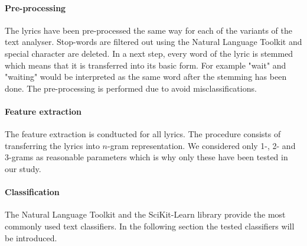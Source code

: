 \documentclass[a4paper,12pt]{article}
\begin{document}
\paragraph{Pre-processing} The lyrics have been pre-processed the same way for each of the variants of the text analyser. Stop-words are filtered out using the Natural Language Toolkit and special character are deleted. In a next step, every word of the lyric is stemmed which means that it is transferred into its basic form. For example "wait" and "waiting" would be interpreted as the same word after the stemming has been done. The pre-processing is performed due to avoid misclassifications. 

\paragraph{Feature extraction} The feature extraction is condtucted for all lyrics. The procedure consists of transferring the lyrics into $n$-gram representation. We considered only 1-, 2- and 3-grams as reasonable parameters which is why only these have been tested in our study. 

\paragraph{Classification} The Natural Language Toolkit and the SciKit-Learn library provide the most commonly used text classifiers. In the following section the tested classifiers will be introduced. 
\end{document}
